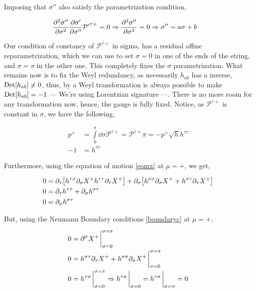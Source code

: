 Imposing that $\sigma''$ also satisfy the parametrization condition,

\begin{align*}
    {\pdv[2]{\sigma''}{\sigma}}{\pdv{\sigma'}{\sigma''}}{\mathcal P'}^{\tau+}&=0\Rightarrow {\pdv[2]{\sigma''}{\sigma}}=0\Rightarrow \sigma''=a\sigma+b
\end{align*}

Our condition of constancy of $\mathcal P^{\tau+}$ in sigma, has a residual affine reparametrization, which we can use to set $\sigma=0$ in one of the ends of the 
string, and $\sigma=\pi$ in the other one. This completely fixes the $\sigma$ parametrization. What remains now is to fix the Weyl redundancy, as necessarily 
$h_{ab}$ has a inverse, $\textup{Det} \qty[h_{ab}]\neq 0$, thus, by a Weyl transformation is always possible to make $\textup{Det} \qty[h_{ab}]=-1$ --- We're using Lorentzian signature ---. There is 
no more room for any transformation now, hence, the gauge is fully fixed. Notice, as $\mathcal P^{\tau+}$ is constant in $\sigma$, we have the following,

\begin{align*}
    p^+&=\int\limits_0^\pi\dd{\sigma}\mathcal P^{\tau+}=\mathcal P^{\tau+}\pi=-p^+\sqrt h h^{\tau\tau}\\
    -1&=h^{\tau\tau}
\end{align*}

Furthermore, using the equation of motion \ref{eomx} at $\mu=+$, we get,

\begin{align*}
    0&=\partial_\tau\qty[h^{\tau\sigma}\partial_\sigma X^+h^{\tau\tau}\partial_\tau X^+]+\partial_\sigma\qty[h^{\sigma\sigma}\partial_\sigma X^++h^{\sigma\tau}\partial_\tau X^+]\\
    0&=\partial_\tau h^{\tau\tau}+\partial_\sigma h^{\sigma\tau}\\
    0&=\partial_\sigma h^{\sigma\tau}
\end{align*}

But, using the Neumann Boundary conditions \ref{boundaryc} at $\mu=+$,

\begin{align*}
    0&=\partial^\sigma X^+\eval_{\sigma=0}^{\sigma=\pi}\\
    0&=h^{\sigma\tau}\partial_\tau X^++h^{\sigma\sigma}\partial_\sigma X^+\eval_{\sigma=0}^{\sigma=\pi}\\
    0&=h^{\tau\sigma}\eval_{\sigma=0}^{\sigma=\pi}\Rightarrow h^{\tau\sigma}\eval_{\sigma=0}=h^{\tau\sigma}\eval_{\sigma=\pi}=0
\end{align*}

